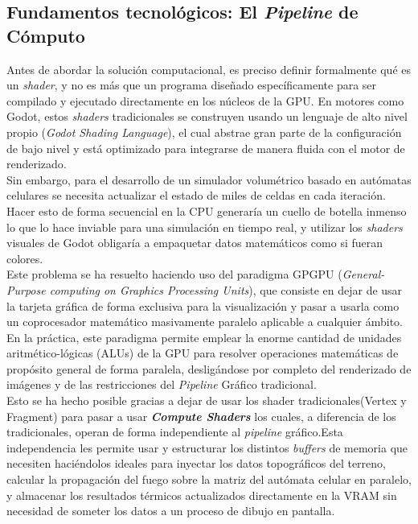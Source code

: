       
    \subsection[\textit{Pipeline} de Cómputo]{Fundamentos tecnológicos: El \textit{Pipeline} de Cómputo}

        Antes de abordar la solución computacional, es preciso definir formalmente qué es un \textit{shader}, y no es más que un programa diseñado específicamente para ser compilado y ejecutado directamente en los núcleos de la GPU. En motores como Godot, estos \textit{shaders} tradicionales se construyen usando un lenguaje de alto nivel propio (\textit{Godot Shading Language}), el cual abstrae gran parte de la configuración de bajo nivel y está optimizado para integrarse de manera fluida con el motor de renderizado\cite{godot_engine}.\\

        Sin embargo, para el desarrollo de un simulador volumétrico basado en autómatas celulares se necesita actualizar el estado de miles de celdas en cada iteración. Hacer esto de forma secuencial en la CPU generaría un cuello de botella inmenso lo que lo hace inviable para una simulación en tiempo real, y utilizar los \textit{shaders} visuales de Godot obligaría a empaquetar datos matemáticos como si fueran colores. \\
    
        Este problema se ha resuelto haciendo uso del paradigma GPGPU (\textit{General-Purpose computing on Graphics Processing Units}), que consiste en dejar de usar la tarjeta gráfica de forma exclusiva para la visualización y pasar a usarla como un coprocesador matemático masivamente paralelo aplicable a cualquier ámbito. En la práctica, este paradigma permite emplear la enorme cantidad de unidades aritmético-lógicas (ALUs) de la GPU para resolver operaciones matemáticas de propósito general de forma paralela, desligándose por completo del renderizado de imágenes y de las restricciones del \textit{Pipeline} Gráfico tradicional\cite{gpugems3_ch30}.\\

        Esto se ha hecho posible gracias a dejar de usar los shader tradicionales(Vertex y Fragment) para pasar a usar \textbf{\textit{Compute Shaders}} los cuales, a diferencia de los tradicionales, operan de forma independiente al \textit{pipeline} gráfico.Esta independencia les permite usar y estructurar los distintos \textit{buffers} de memoria que necesiten haciéndolos ideales para inyectar los datos topográficos del terreno, calcular la propagación del fuego sobre la matriz del autómata celular en paralelo, y almacenar los resultados térmicos actualizados directamente en la VRAM sin necesidad de someter los datos a un proceso de dibujo en pantalla\cite{gpugems_ch38}.\\

